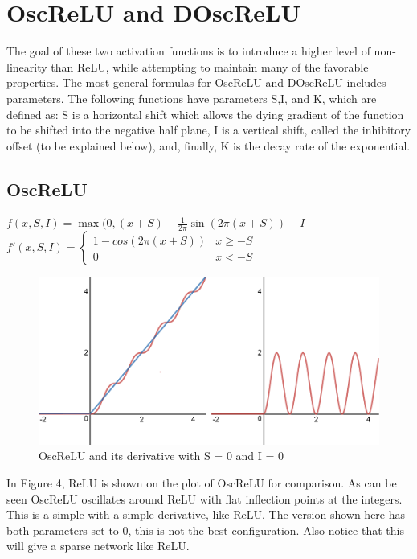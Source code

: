 \documentclass{amsart}
\theoremstyle{definition}
\theoremstyle{remark}
\numberwithin{equation}{section}
\newcommand{\blankbox}[2]{%
  \parbox{\columnwidth}{\centering
    \setlength{\fboxsep}{0pt}%
    \fbox{\raisebox{0pt}[#2]{\hspace{#1}}}%
  }%
}
\begin{document}
\hfill\break
\section{OscReLU and DOscReLU}  

The goal of these two activation functions is to introduce a higher level of non-linearity than ReLU, while attempting to maintain many of the favorable properties. The most general formulas for OscReLU and DOscReLU includes parameters. 
The following functions have parameters S,I, and K, which are defined as:  S is a horizontal shift which allows the dying gradient of the function to be shifted into the negative half plane, I is a vertical shift, called the inhibitory offset (to be explained below), and, finally, K is the decay rate of the exponential.  
\newpage
\subsection{OscReLU}  \hfill \break 
\hfill\break
$f(x,S,I) = \max(0, (x + S) - \frac{1}{2\pi}\sin(2\pi (x+S)) - I$ \hfill \break
\hfill\break
$f'(x,S,I) = \begin{cases} 1 - cos(2\pi (x+S)) & x \geq -S \\ 0 & x < -S\end{cases}$ \hfill \break

\begin{figure}[!h]
\includegraphics[1]{OscReLU_with_ReLU_Derive.png}
\caption{OscReLU and its derivative with S = 0 and I = 0}
\label{Figure 4}
\end{figure}  

In Figure 4, ReLU is shown on the plot of OscReLU for comparison. As can be seen OscReLU oscillates around ReLU with flat inflection points at the integers. This is a simple with a simple derivative, like ReLU. The version shown here has both parameters set to 0, this is not the best configuration.  Also notice that this will give a sparse network like ReLU.   
\end{document}
